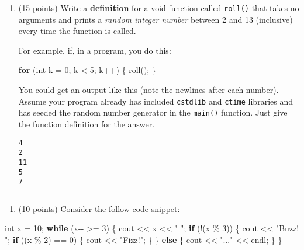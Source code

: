 \documentclass[
]{article}
\newenvironment{Shaded}{}{}
\newcommand{\ControlFlowTok}[1]{\textcolor[rgb]{0.00,0.44,0.13}{\textbf{#1}}}
\newcommand{\DataTypeTok}[1]{\textcolor[rgb]{0.56,0.13,0.00}{#1}}
\newcommand{\DecValTok}[1]{\textcolor[rgb]{0.25,0.63,0.44}{#1}}
\newcommand{\NormalTok}[1]{#1}
\newcommand{\StringTok}[1]{\textcolor[rgb]{0.25,0.44,0.63}{#1}}
\providecommand{\tightlist}{%
  \setlength{\itemsep}{0pt}\setlength{\parskip}{0pt}}
\begin{document}
\pagebreak

\begin{enumerate}
\def\labelenumi{\arabic{enumi}.}
\setcounter{enumi}{1}
\item
  (15 points) Write a \textbf{definition} for a void function called
  \texttt{roll()} that takes no arguments and prints a \emph{random
  integer number} between 2 and 13 (inclusive) every time the function
  is called.

  For example, if, in a program, you do this:

\begin{Shaded}
\begin{Highlighting}[]
\ControlFlowTok{for}\NormalTok{ (}\DataTypeTok{int}\NormalTok{ k = }\DecValTok{0}\NormalTok{; k \textless{} }\DecValTok{5}\NormalTok{; k++) \{}
\NormalTok{    roll();}
\NormalTok{\}}
\end{Highlighting}
\end{Shaded}

  You could get an output like this (note the newlines after each
  number). Assume your program already has included \texttt{cstdlib} and
  \texttt{ctime} libraries and has seeded the random number generator in
  the \texttt{main()} function. Just give the function definition for
  the answer.

\begin{verbatim}
4
2
11
5
7
\end{verbatim}
\end{enumerate}

\begin{verbatim}

\end{verbatim}

\pagebreak

\begin{enumerate}
\def\labelenumi{\arabic{enumi}.}
\setcounter{enumi}{2}
\tightlist
\item
  (10 points) Consider the follow code snippet:
\end{enumerate}

\begin{Shaded}
\begin{Highlighting}[]
\DataTypeTok{int}\NormalTok{ x = }\DecValTok{10}\NormalTok{;}
\ControlFlowTok{while}\NormalTok{ (x{-}{-} \textgreater{}= }\DecValTok{3}\NormalTok{) \{}
\NormalTok{    cout \textless{}\textless{} x \textless{}\textless{} }\StringTok{" "}\NormalTok{;}
    \ControlFlowTok{if}\NormalTok{ (!(x \% }\DecValTok{3}\NormalTok{)) \{}
\NormalTok{        cout \textless{}\textless{} }\StringTok{"Buzz! "}\NormalTok{;}
        \ControlFlowTok{if}\NormalTok{ ((x \% }\DecValTok{2}\NormalTok{) == }\DecValTok{0}\NormalTok{) \{}
\NormalTok{            cout \textless{}\textless{} }\StringTok{"Fizz!"}\NormalTok{;}
\NormalTok{        \}}
\NormalTok{    \}}
    \ControlFlowTok{else}\NormalTok{ \{}
\NormalTok{        cout \textless{}\textless{} }\StringTok{"..."}\NormalTok{ \textless{}\textless{} endl;}
\NormalTok{    \}}
\NormalTok{\}}
\end{Highlighting}
\end{Shaded}
\end{document}
